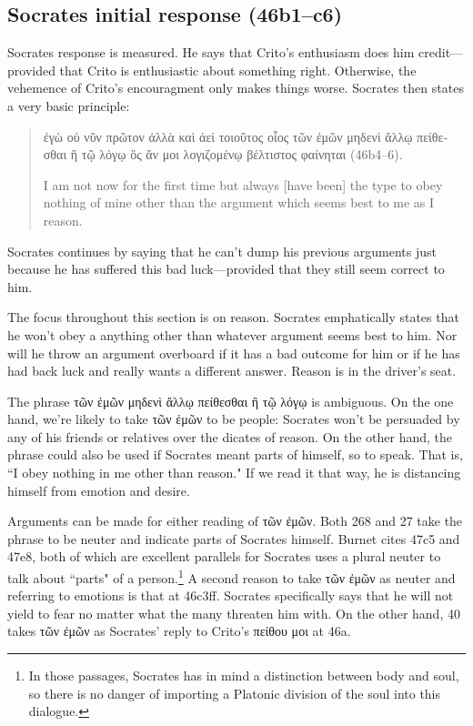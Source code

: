 \documentclass[12pt,letterpaper]{article}
\begin{document}

\subsection*{Socrates initial response (46b1--c6)}

Socrates response is measured. He says that Crito's enthusiasm does him credit---provided that Crito is enthusiastic about something right. Otherwise, the vehemence of Crito's encouragment only makes things worse. Socrates then states a very basic principle:

\begin{quote}
    \textgreek{ἐγὼ οὐ νῦν πρῶτον ἀλλὰ καὶ ἀεὶ τοιοῦτος οἷος τῶν ἐμῶν μηδενὶ ἄλλῳ πείθεσθαι ἢ τῷ λόγῳ ὃς ἄν μοι λογιζομένῳ βέλτιστος φαίνηται} (46b4--6).

    I am not now for the first time but always [have been] the type to obey nothing of mine other than the argument which seems best to me as I reason.
\end{quote}

Socrates continues by saying that he can't dump his previous arguments just because he has suffered this bad luck---provided that they still seem correct to him.

The focus throughout this section is on reason. Socrates emphatically states that he won't obey a anything other than whatever argument seems best to him. Nor will he throw an argument overboard if it has a bad outcome for him or if he has had back luck and really wants a different answer. Reason is in the driver's seat.

The phrase \textgreek{τῶν ἐμῶν μηδενὶ ἄλλῳ πείθεσθαι ἢ τῷ λόγῳ} is ambiguous. On the one hand, we're likely to take \textgreek{τῶν ἐμῶν} to be people: Socrates won't be persuaded by any of his friends or relatives over the dicates of reason. On the other hand, the phrase could also be used if Socrates meant parts of himself, so to speak. That is, ``I obey nothing in me other than reason." If we read it that way, he is distancing himself from emotion and desire.

Arguments can be made for either reading of \textgreek{τῶν ἐμῶν}. Both \cite{burnet1924-euthyphro-apology-crito} 268 and \cite{rose1983} 27 take the phrase to be neuter and indicate parts of Socrates himself. Burnet cites 47c5 and 47e8, both of which are excellent parallels for Socrates uses a plural neuter to talk about ``parts" of a person.\footnote{In those passages, Socrates has in mind a distinction between body and soul, so there is no danger of importing a Platonic division of the soul into this dialogue.} A second reason to take \textgreek{τῶν ἐμῶν} as neuter and referring to emotions is that at 46c3ff. Socrates specifically says that he will not yield to fear no matter what the many threaten him with. On the other hand, \cite{adam1988-crito} 40 takes \textgreek{τῶν ἐμῶν} as Socrates' reply to Crito's \textgreek{πείθου μοι} at 46a.
\end{document}
